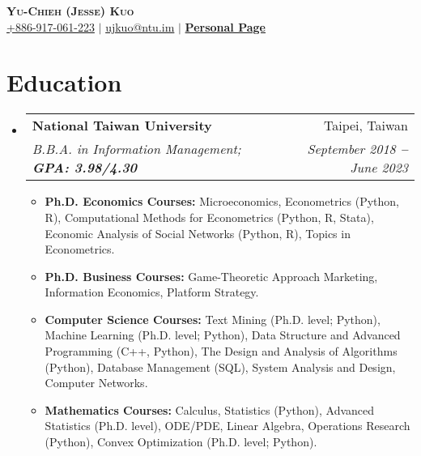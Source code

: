 \documentclass[letterpaper,11pt]{article}
\makeatletter
\newcommand{\resumeItem}[1]{
  \item\small{
    {#1 \vspace{-2pt}}
  }
}
\newcommand{\resumeSubheading}[4]{
  \vspace{-7pt}\item
    \begin{tabular*}{\textwidth}[t]{l@{\extracolsep{\fill}}r}
      \textbf{#1} & #2 \\
      \textit{\small#3} & \textit{\small #4} \\
    \end{tabular*}\vspace{-7pt}
}
\newcommand{\resumeSubHeadingListStart}{\begin{itemize}[leftmargin=0in, label={}]}
\newcommand{\resumeSubHeadingListEnd}{\end{itemize}}
\newcommand{\resumeItemListStart}{\begin{itemize}[leftmargin=0.13in]}
\newcommand{\resumeItemListEnd}{\end{itemize}\vspace{-5pt}}
\makeatother
\begin{document}

\begin{center}
  \textbf{\Huge \scshape Yu-Chieh (Jesse) Kuo} \\ \vspace{3pt}
    \small
   \hspace{.5pt} \href{tel:886917061223}{+886-917-061-223}
    $|$
    \hspace{.5pt} \href{mailto:ujkuo@ntu.im}{ujkuo@ntu.im}
    $|$
   \hspace{.5pt} \textbf{\href{https://ujkuo.github.io}{Personal Page}}
\end{center}


\section{Education}
  \vspace{1pt}
  \resumeSubHeadingListStart
    
    \resumeSubheading
      {National Taiwan University
      }{Taipei, Taiwan}
      {B.B.A. in Information Management;   \textbf{GPA: 3.98/4.30}}{September 2018 \textbf{--} June 2023}
      \resumeItemListStart
        \resumeItem{\textbf{Ph.D. Economics Courses:}
                Microeconomics, Econometrics (Python, R),
                Computational Methods for Econometrics (Python, R, Stata),
                Economic Analysis of Social Networks (Python, R),
                Topics in Econometrics.}
        \resumeItem{\textbf{Ph.D. Business Courses:}
                Game-Theoretic Approach Marketing,
                Information Economics, Platform Strategy.}
        \resumeItem{\textbf{Computer Science Courses:}
            Text Mining (Ph.D. level; Python),
            Machine Learning (Ph.D. level; Python),
                Data Structure and Advanced Programming (C++, Python),
                The Design and Analysis of Algorithms (Python),
                Database Management (SQL),
                System Analysis and Design,
                Computer Networks.}
        \resumeItem{\textbf{Mathematics Courses:}
                Calculus,
                Statistics (Python),
                Advanced Statistics (Ph.D. level),
                ODE/PDE,
                Linear Algebra,
                Operations Research (Python),
                Convex Optimization (Ph.D. level; Python).}
      \resumeItemListEnd
  \resumeSubHeadingListEnd
\end{document}
